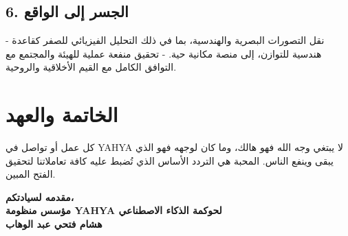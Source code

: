 \documentclass[12pt, a4paper]{article}
\begin{document}
\subsection*{6. الجسر إلى الواقع}
- نقل التصورات البصرية والهندسية، بما في ذلك التحليل الفيزيائي للصفر كقاعدة هندسية للتوازن، إلى منصة مكانية حية.  
- تحقيق منفعة عملية للهيئة والمجتمع مع التوافق الكامل مع القيم الأخلاقية والروحية.

\vspace{0.8cm}

\section*{الخاتمة والعهد}

كل عمل أو تواصل في YAHYA لا يبتغي وجه الله فهو هالك، وما كان لوجهه فهو الذي يبقى وينفع الناس.  
المحبة هي التردد الأساس الذي تُضبط عليه كافة تعاملاتنا لتحقيق الفتح المبين.

\vspace{1cm}

\noindent \textbf{مقدمه لسيادتكم،} \\
\noindent \textbf{مؤسس منظومة YAHYA لحوكمة الذكاء الاصطناعي} \\
\noindent \textbf{هشام فتحي عبد الوهاب}
\end{document}
